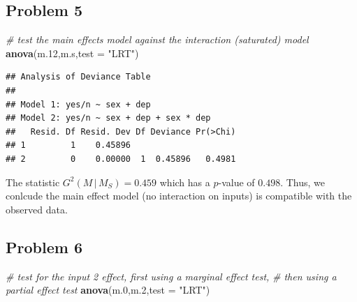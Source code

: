 \documentclass[
  11pt,
]{article}
\newenvironment{Shaded}{\begin{snugshade}}{\end{snugshade}}
\newcommand{\AttributeTok}[1]{\textcolor[rgb]{0.13,0.29,0.53}{#1}}
\newcommand{\CommentTok}[1]{\textcolor[rgb]{0.56,0.35,0.01}{\textit{#1}}}
\newcommand{\FloatTok}[1]{\textcolor[rgb]{0.00,0.00,0.81}{#1}}
\newcommand{\FunctionTok}[1]{\textcolor[rgb]{0.13,0.29,0.53}{\textbf{#1}}}
\newcommand{\NormalTok}[1]{#1}
\newcommand{\StringTok}[1]{\textcolor[rgb]{0.31,0.60,0.02}{#1}}
\begin{document}
\hypertarget{problem-5-1}{%
\subsection{Problem 5}\label{problem-5-1}}


\begin{Shaded}
\begin{Highlighting}[]
\CommentTok{\# test the main effects model against the interaction (saturated) model}
\FunctionTok{anova}\NormalTok{(m}\FloatTok{.12}\NormalTok{,m.s,}\AttributeTok{test =} \StringTok{"LRT"}\NormalTok{)}
\end{Highlighting}
\end{Shaded}

\begin{verbatim}
## Analysis of Deviance Table
## 
## Model 1: yes/n ~ sex + dep
## Model 2: yes/n ~ sex + dep + sex * dep
##   Resid. Df Resid. Dev Df Deviance Pr(>Chi)
## 1         1    0.45896                     
## 2         0    0.00000  1  0.45896   0.4981
\end{verbatim}

The statistic \(G^2(M\,|\,M_S) = 0.459\) which has a \(p\)-value of
\(0.498\). Thus, we conlcude the main effect model (no interaction on
inputs) is compatible with the observed data.

\hypertarget{problem-6-1}{%
\subsection{Problem 6}\label{problem-6-1}}


\begin{Shaded}
\begin{Highlighting}[]
\CommentTok{\# test for the input 2 effect, first using a marginal effect test,}
\CommentTok{\# then using a partial effect test}
\FunctionTok{anova}\NormalTok{(m}\FloatTok{.0}\NormalTok{,m}\FloatTok{.2}\NormalTok{,}\AttributeTok{test =} \StringTok{"LRT"}\NormalTok{)}
\end{Highlighting}
\end{Shaded}
\end{document}
